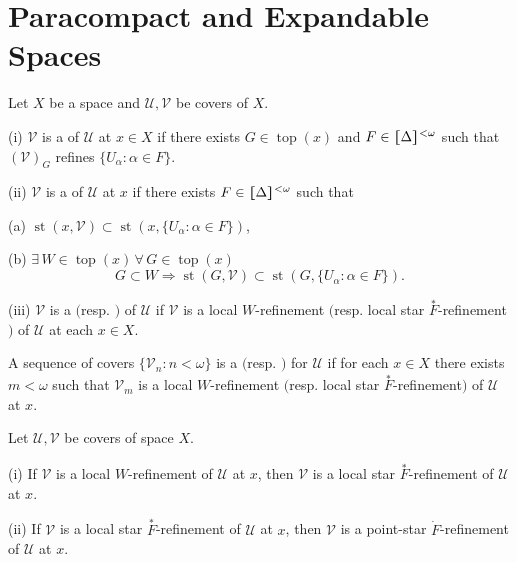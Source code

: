 \documentclass[jisng7iii.tex]{subfiles}
\begin{document}
	
\section{Paracompact and Expandable Spaces} \label{sec:7.2}



{ 
Let $X$ be a space and $\mathscr{U}, \mathscr{V}$ be covers of $X$.

\textup{(i)} $\mathscr{V}$ is a 
of $\mathscr{U}$ at $x \in X$ if there exists $G \in \operatorname{top}(x)$ and 
$F\in\hstretch{1.8}{[}\Delta\hstretch{1.8}{]}^{<\omega}$ such that $(\mathscr{V})_G$ refines $\{U_\alpha: \alpha \in F\}$.

\textup{(ii)} $\mathscr{V}$ is a 
of $\mathscr{U}$ at $x$ if there exists  $F\in\hstretch{1.8}{[}\Delta\hstretch{1.8}{]}^{<\omega}$ such that

\quad \textup{(a)} $\operatorname{st}(x, \mathscr{V}) \subset 
\operatorname{st}(x, \{U_\alpha: \alpha\in F\})$,

\quad \textup{(b)} $\exists \, W \in \operatorname{top}(x) \, 
\forall \, G\in \operatorname{top}(x)$
$$G\subset W \Rightarrow \operatorname{st}(G, \mathscr{V}) \subset 
\operatorname{st}(G, \{U_\alpha: \alpha\in F\}).$$

\textup{(iii)} $\mathscr{V}$ is a 
 $($resp. $)$ of $\mathscr{U}$ 
 if $\mathscr{V}$ is a local $W$-refinement $($resp. local star 
 $\overset{*}{F}$-refinement$)$ of $\mathscr{U}$ 
 at each $x \in X$.

A sequence of covers $\{\mathscr{V}_n: n < \omega\}$ is a 
$($resp. 
$)$ 
for $\mathscr{U}$ 
if for each $x \in X$ there exists $m < \omega$ such that $\mathscr{V}_m$ is a 
local $W$-refinement $($resp. local star $\overset{*}{F}$-refinement$)$ of $\mathscr{U}$ at $x$.
}


{\lemma{} \label{lem:7.2.2}
Let $\mathscr{U}, \mathscr{V}$ be covers of space $X$.

\textup{(i)} If $\mathscr{V}$ is a local $W$-refinement of $\mathscr{U}$ at $x$, then $\mathscr{V}$ is a local star $\overset{*}{F}$-refinement of $\mathscr{U}$ at $x$.


\textup{(ii)} If $\mathscr{V}$ is a local star $\overset{*}{F}$-refinement of $\mathscr{U}$ at $x$, then $\mathscr{V}$ is a point-star $\dot{F}$-refinement of $\mathscr{U}$ at $x$.
}
\end{document}
